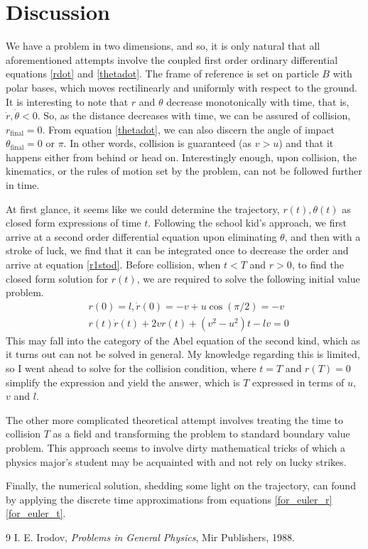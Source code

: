 \documentclass{article}
\begin{document}
\section*{Discussion}

We have a problem in two dimensions, and so,
it is only natural that all aforementioned attempts involve the
coupled first order ordinary differential equations
\ref{rdot} and \ref{thetadot}.
The frame of reference is set on particle $B$ with polar bases,
which moves rectilinearly and uniformly
with respect to the ground.
It is interesting to note that $r$ and $\theta$
decrease monotonically with time,
that is,
$\dot{r}, \dot{\theta} < 0$.
So,
as the distance decreases with time,
we can be assured of collision, $r_{\text{final}}=0$.
From equation \ref{thetadot},
we can also discern the angle of impact
$\theta_{\text{final}} = 0 \text{ or } \pi$.
In other words,
collision is guaranteed (as $v > u$)
and that it happens either from behind or head on.
Interestingly enough,
upon collision,
the kinematics,
or the rules of motion set by the problem,
can not be followed further in time.

At first glance,
it seems like we could determine the trajectory,
$r(t),\theta(t)$ as closed form expressions of time $t$.
Following the school kid's approach,
we first arrive at a second order differential equation
upon eliminating $\theta$,
and then with a stroke of luck,
we find that it can be integrated once to decrease the order
and arrive at equation \ref{r1stod}.
Before collision,
when $t<T$ and $r > 0$,
to find the closed form solution for $r(t)$,
we are required to solve the following initial value problem.
\begin{align*}
	& r(0) = l,
	\dot{r}(0) = -v + u \cos(\pi/2) = -v \\
	& r(t) \dot{r}(t) + 2v r(t) + (v^2 - u^2)t - lv = 0
\end{align*}
This may fall into the category of the
Abel equation of the second kind,
which as it turns out can not be solved in general.
My knowledge regarding this is limited,
so I went ahead to solve for the collision condition,
where $t=T$ and $r(T) = 0$
simplify the expression and yield the answer,
which is $T$ expressed in terms of $u$, $v$ and $l$.

The other more complicated theoretical attempt
involves treating the time to collision $T$ as a field
and transforming the problem to standard boundary value problem.
This approach seems to involve dirty mathematical tricks
of which a physics major's student may be acquainted with
and not rely on lucky strikes.

Finally,
the numerical solution,
shedding some light on the trajectory,
can found by applying the discrete time approximations
from equations \ref{for_euler_r} \ref{for_euler_t}.

\begin{thebibliography}{9}
 I. E. Irodov, \textit{Problems in General Physics}, Mir Publishers, 1988.
\end{thebibliography}
\end{document}
